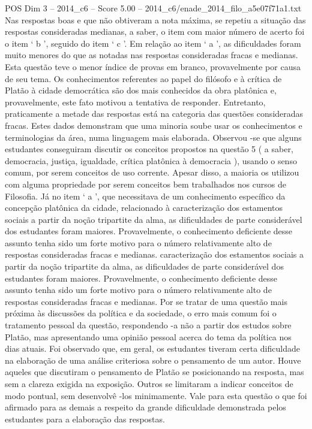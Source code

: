 \begin{textsample}{POS Dim 3 – 2014\_c6 – Score 5.00 – 2014\_c6/enade\_2014\_filo\_a5e07f71a1.txt}
Nas respostas boas e que não obtiveram a nota máxima, se repetiu a situação das respostas consideradas medianas, a saber, o item com maior número de acerto foi o item ‘ b ’, seguido do item ‘ c ’.
Em relação ao item ‘ a ’, as dificuldades foram muito menores do que as notadas nas respostas consideradas fracas e medianas.
Esta questão teve o menor índice de provas em branco, provavelmente por causa de seu tema.
Os conhecimentos referentes ao papel do filósofo e à crítica de Platão à cidade democrática são dos mais conhecidos da obra platônica e, provavelmente, este fato motivou a tentativa de responder.
Entretanto, praticamente a metade das respostas está na categoria das questões consideradas fracas.
Estes dados demonstram que uma minoria soube usar os conhecimentos e terminologias da área, numa linguagem mais elaborada.
Observou -se que alguns estudantes conseguiram discutir os conceitos propostos na questão 5 ( a saber, democracia, justiça, igualdade, crítica platônica à democracia ), usando o senso comum, por serem conceitos de uso corrente.
Apesar disso, a maioria os utilizou com alguma propriedade por serem conceitos bem trabalhados nos cursos de Filosofia.
Já no item ‘ a ’, que necessitava de um conhecimento específico da concepção platônica da cidade, relacionado à caracterização dos estamentos sociais a partir da noção tripartite da alma, as dificuldades de parte considerável dos estudantes foram maiores.
Provavelmente, o conhecimento deficiente desse assunto tenha sido um forte motivo para o número relativamente alto de respostas consideradas fracas e medianas. caracterização dos estamentos sociais a partir da noção tripartite da alma, as dificuldades de parte considerável dos estudantes foram maiores.
Provavelmente, o conhecimento deficiente desse assunto tenha sido um forte motivo para o número relativamente alto de respostas consideradas fracas e medianas.
Por se tratar de uma questão mais próxima às discussões da política e da sociedade, o erro mais comum foi o tratamento pessoal da questão, respondendo -a não a partir dos estudos sobre Platão, mas apresentando uma opinião pessoal acerca do tema da política nos dias atuais.
Foi observado que, em geral, os estudantes tiveram certa dificuldade na elaboração de uma análise criteriosa sobre o pensamento de um autor.
Houve aqueles que discutiram o pensamento de Platão se posicionando na resposta, mas sem a clareza exigida na exposição.
Outros se limitaram a indicar conceitos de modo pontual, sem desenvolvê -los minimamente.
Vale para esta questão o que foi afirmado para as demais a respeito da grande dificuldade demonstrada pelos estudantes para a elaboração das respostas.

\end{textsample}
